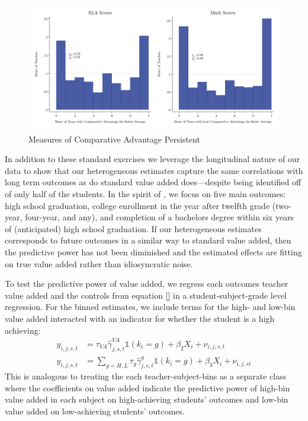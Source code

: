 \documentclass[12pt]{article}
\theoremstyle{definition}
\theoremstyle{definition}
\theoremstyle{definition}
\theoremstyle{definition}
\begin{document}
\begin{figure}
    \includegraphics[width=\textwidth]{Working_Paper/test_figures/02b_hist.pdf}
    \caption{Measures of Comparative Advantage Persistent}
    \label{fig:robust2}
\end{figure}


In addition to these standard exercises we leverage the longitudinal nature of our data to show that our heterogeneous estimates capture the same correlations with long term outcomes as do standard value added does---despite being identified off of only half of the students.  In the spirit of \citet{chetty2014measuring2}, we focus on five main outcomes: high school graduation, college enrollment in the year after twelfth grade (two-year, four-year, and any), and completion of a bachelors degree within six years of (anticipated) high school graduation. If our heterogeneous estimates corresponds to future outcomes in a similar way to standard value added, then the predictive power has not been diminished and the estimated effects are fitting on true value added rather than idiosyncratic noise. 

To test the predictive power of value added, we regress each outcomes teacher value added and the controls from equation \ref{} in a student-subject-grade level regression. For the binned estimates, we include terms for the high- and low-bin value added interacted with an indicator for whether the student is a high achieving: 
    \begin{align}\label{long}
        y_{i,j,s,t} &= \tau_{VA} \hat{\gamma}^{VA}_{j,s,t}\mathds{1}(k_i = g) + \beta_2 X_i + \nu_{i,j,s,t} \\ \nonumber
        y_{i,j,s,t} &= \sum_{g=H,L} \tau_{g} \hat{\gamma}^g_{j,s,t}\mathds{1}(k_i = g) + \beta_3 X_i + \nu_{i,j,st}
    \end{align}
\noindent   This is analogous to treating the each teacher-subject-bins as a separate class where the coefficients on value added indicate the predictive power of high-bin value added in each subject on high-achieving students' outcomes  and low-bin value added on low-achieving students' outcomes. 
\end{document}
